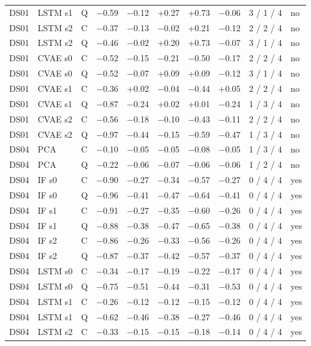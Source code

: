 \documentclass[10pt]{article}
\begin{document}
{\begin{longtable}{lllrrrrrcl}
DS01 & LSTM s1 & Q & −0.59 & −0.12 & +0.27 & +0.73 & −0.06 & 3 / 1 / 4 & no \\
DS01 & LSTM s2 & C & −0.37 & −0.13 & −0.02 & +0.21 & −0.12 & 2 / 2 / 4 & no \\
DS01 & LSTM s2 & Q & −0.46 & −0.02 & +0.20 & +0.73 & −0.07 & 3 / 1 / 4 & no \\
DS01 & CVAE s0 & C & −0.52 & −0.15 & −0.21 & −0.50 & −0.17 & 2 / 2 / 4 & no \\
DS01 & CVAE s0 & Q & −0.52 & −0.07 & +0.09 & +0.09 & −0.12 & 3 / 1 / 4 & no \\
DS01 & CVAE s1 & C & −0.36 & +0.02 & −0.04 & −0.44 & +0.05 & 2 / 2 / 4 & no \\
DS01 & CVAE s1 & Q & −0.87 & −0.24 & +0.02 & +0.01 & −0.24 & 1 / 3 / 4 & no \\
DS01 & CVAE s2 & C & −0.56 & −0.18 & −0.10 & −0.43 & −0.11 & 2 / 2 / 4 & no \\
DS01 & CVAE s2 & Q & −0.97 & −0.44 & −0.15 & −0.59 & −0.47 & 1 / 3 / 4 & no \\
\midrule
DS04 & PCA & C & −0.10 & −0.05 & −0.05 & −0.08 & −0.05 & 1 / 3 / 4 & no \\
DS04 & PCA & Q & −0.22 & −0.06 & −0.07 & −0.06 & −0.06 & 1 / 2 / 4 & no \\
DS04 & IF s0 & C & −0.90 & −0.27 & −0.34 & −0.57 & −0.27 & 0 / 4 / 4 & yes \\
DS04 & IF s0 & Q & −0.96 & −0.41 & −0.47 & −0.64 & −0.41 & 0 / 4 / 4 & yes \\
DS04 & IF s1 & C & −0.91 & −0.27 & −0.35 & −0.60 & −0.26 & 0 / 4 / 4 & yes \\
DS04 & IF s1 & Q & −0.88 & −0.38 & −0.47 & −0.65 & −0.38 & 0 / 4 / 4 & yes \\
DS04 & IF s2 & C & −0.86 & −0.26 & −0.33 & −0.56 & −0.26 & 0 / 4 / 4 & yes \\
DS04 & IF s2 & Q & −0.87 & −0.37 & −0.42 & −0.57 & −0.37 & 0 / 4 / 4 & yes \\
DS04 & LSTM s0 & C & −0.34 & −0.17 & −0.19 & −0.22 & −0.17 & 0 / 4 / 4 & yes \\
DS04 & LSTM s0 & Q & −0.75 & −0.51 & −0.44 & −0.31 & −0.53 & 0 / 4 / 4 & yes \\
DS04 & LSTM s1 & C & −0.26 & −0.12 & −0.12 & −0.15 & −0.12 & 0 / 4 / 4 & yes \\
DS04 & LSTM s1 & Q & −0.62 & −0.46 & −0.38 & −0.27 & −0.46 & 0 / 4 / 4 & yes \\
DS04 & LSTM s2 & C & −0.33 & −0.15 & −0.15 & −0.18 & −0.14 & 0 / 4 / 4 & yes \\

\end{longtable}}
\end{document}
